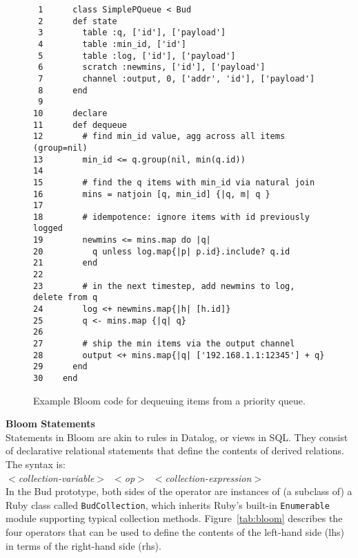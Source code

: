 \begin{figure}[t]
\begin{scriptsize}
\begin{verbatim}
 1      class SimplePQueue < Bud
 2      def state
 3        table :q, ['id'], ['payload']
 4        table :min_id, ['id']
 5        table :log, ['id'], ['payload']
 6        scratch :newmins, ['id'], ['payload']
 7        channel :output, 0, ['addr', 'id'], ['payload']
 8      end
 9    
10      declare
11      def dequeue
12        # find min_id value, agg across all items (group=nil)
13        min_id <= q.group(nil, min(q.id))
14    
15        # find the q items with min_id via natural join
16        mins = natjoin [q, min_id] {|q, m| q }
17    
18        # idempotence: ignore items with id previously logged
19        newmins <= mins.map do |q| 
20          q unless log.map{|p| p.id}.include? q.id
21        end
22
23        # in the next timestep, add newmins to log, delete from q
24        log <+ newmins.map{|h| [h.id]}
25        q <- mins.map {|q| q}
26      
27        # ship the min items via the output channel
28        output <+ mins.map{|q| ['192.168.1.1:12345'] + q}
29      end
30    end
\end{verbatim}
\vspace{-10pt}
\caption{Example Bloom code for dequeuing items from a priority queue.}
\label{fig:queue}
\end{scriptsize}
\vspace{-2pt}
\end{figure}


\textbf{Bloom Statements}\\
\noindent
Statements in Bloom are akin to rules in Datalog, or views in SQL.  They consist of declarative relational statements that define the contents of derived relations.  The syntax is:\\
\noindent
\mbox{\hspace{0.25in}\emph{$<$collection-variable$>$ $<$op$>$ $<$collection-expression$>$}}\\
\noindent
In the Bud prototype, both sides of the operator are instances of (a subclass of) a Ruby class called \texttt{BudCollection}, which inherits Ruby's built-in \texttt{Enumerable} module supporting typical collection methods.  Figure~\ref{tab:bloom} describes the four operators that can be used to define the contents of the left-hand side (lhs) in terms of the right-hand side (rhs).


